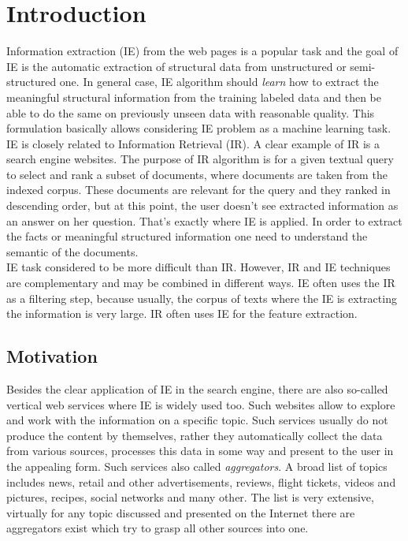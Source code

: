 \chapter{Introduction}
\label{chap:intro}
Information extraction (IE) from the web pages is a popular task and the goal of IE is the automatic extraction of structural data from unstructured or semi-structured one. In general case, IE algorithm should \textit{learn} how to extract the meaningful structural information from the training labeled data and then be able to do the same on previously unseen data with reasonable quality. This formulation basically allows considering IE problem as a machine learning task.\\

IE is closely related to Information Retrieval (IR). A clear example of IR is a search engine websites. The purpose of IR algorithm is for a given textual query to select and rank a subset of documents, where documents are taken from the indexed corpus. These documents are relevant for the query and they ranked in descending order, but at this point, the user doesn't see extracted information as an answer on her question. That's exactly where IE is applied. In order to extract the facts or meaningful structured information one need to understand the semantic of the documents.\\

IE task considered to be more difficult than IR. However, IR and IE techniques are complementary and may be combined in different ways. IE often uses the IR as a filtering step, because usually, the corpus of texts where the IE is extracting the information is very large. IR often uses IE for the feature extraction.\\
\cite{IEstate}

\section{Motivation}
Besides the clear application of IE in the search engine, there are also so-called vertical web services where IE is widely used too. Such websites allow to explore and work with the information on a specific topic. Such services usually do not produce the content by themselves, rather they automatically collect the data from various sources, processes this data in some way and present to the user in the appealing form. Such services also called \textit{aggregators}. A broad list of topics includes news, retail and other advertisements, reviews, flight tickets, videos and pictures, recipes, social networks and many other. The list is very extensive, virtually for any topic discussed and presented on the Internet there are aggregators exist which try to grasp all other sources into one. \\

